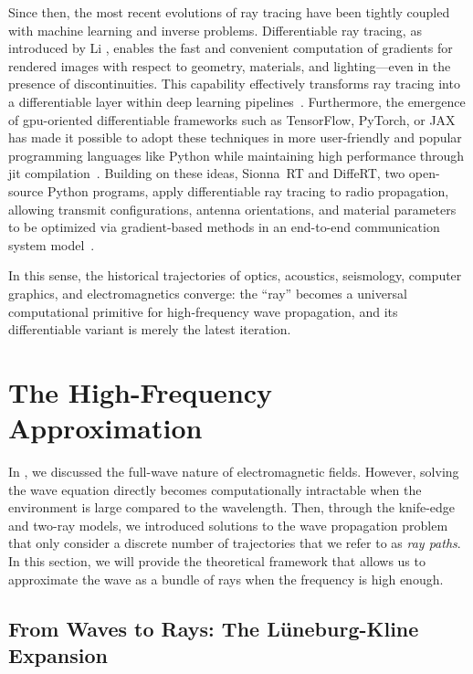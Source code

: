 Since then, the most recent evolutions of ray tracing have been tightly coupled with machine learning and inverse problems. Differentiable ray tracing, as introduced by Li \etal, enables the fast and convenient computation of gradients for rendered images with respect to geometry, materials, and lighting---even in the presence of discontinuities. This capability effectively transforms ray tracing into a differentiable layer within deep learning pipelines~. Furthermore, the emergence of \gls{gpu}-oriented differentiable frameworks such as TensorFlow, PyTorch, or JAX has made it possible to adopt these techniques in more user-friendly and popular programming languages like Python while maintaining high performance through \gls{jit} compilation~. Building on these ideas, Sionna~RT and DiffeRT, two open-source Python programs, apply differentiable ray tracing to radio propagation, allowing transmit configurations, antenna orientations, and material parameters to be optimized via gradient-based methods in an end-to-end communication system model~.

In this sense, the historical trajectories of optics, acoustics, seismology, computer graphics, and electromagnetics converge: the \enquote{ray} becomes a universal computational primitive for high-frequency wave propagation, and its differentiable variant is merely the latest iteration.

\section{The High-Frequency Approximation}

In , we discussed the full-wave nature of electromagnetic fields. However, solving the wave equation directly becomes computationally intractable when the environment is large compared to the \gls{wavelength}. Then, through the knife-edge and two-ray models, we introduced solutions to the wave propagation problem that only consider a discrete number of trajectories that we refer to as \emph{ray paths}. In this section, we will provide the theoretical framework that allows us to approximate the wave as a bundle of rays when the frequency is high enough.

\subsection{From Waves to Rays: The Lüneburg-Kline Expansion}

